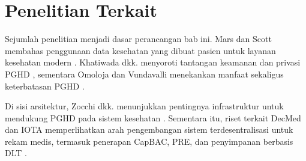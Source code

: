 \section{Penelitian Terkait}

Sejumlah penelitian menjadi dasar perancangan bab ini. Mars dan Scott membahas penggunaan data kesehatan yang dibuat pasien untuk layanan kesehatan modern \parencite{Mars_Scott_2022}. Khatiwada dkk. menyoroti tantangan keamanan dan privasi PGHD \parencite{Khatiwada_Yang_Lin_Blobel_2024}, sementara Omoloja dan Vundavalli menekankan manfaat sekaligus keterbatasan PGHD \parencite{Omoloja_Vundavalli_2021}.

Di sisi arsitektur, Zocchi dkk. menunjukkan pentingnya infrastruktur untuk mendukung PGHD pada sistem kesehatan \parencite{Zocchi_2025}. Sementara itu, riset terkait DecMed dan IOTA memperlihatkan arah pengembangan sistem terdesentralisasi untuk rekam medis, termasuk penerapan CapBAC, PRE, dan penyimpanan berbasis DLT \parencite{Akbulut_2026,Purnama_2025,AfyaRepo_2024}.
